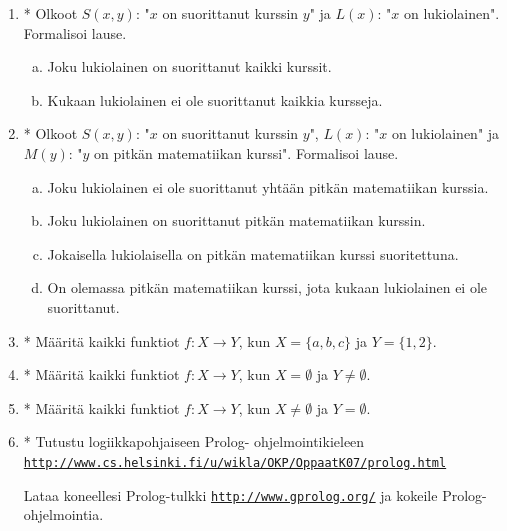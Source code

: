 \begin{enumerate}
\item * %
 Olkoot $S(x,y)$: "$x$ on suorittanut
kurssin $y$" ja $L(x)$: "$x$ on lukiolainen". Formalisoi lause.
\begin{enumerate}[a)]
\item Joku lukiolainen on suorittanut kaikki kurssit.
\item Kukaan lukiolainen ei ole suorittanut kaikkia kursseja.
\end{enumerate}

\item * %
Olkoot $S(x,y)$: "$x$ on suorittanut
kurssin $y$", $L(x)$: "$x$ on lukiolainen" ja $M(y)$: "$y$ on
pitkän matematiikan kurssi". Formalisoi lause.
\begin{enumerate}[a)]
\item Joku lukiolainen ei ole suorittanut yhtään pitkän
matematiikan kurssia.
\item Joku lukiolainen on suorittanut pitkän matematiikan
kurssin.
\item Jokaisella lukiolaisella on pitkän matematiikan kurssi
suoritettuna.
\item On olemassa pitkän matematiikan kurssi, jota kukaan
lukiolainen ei ole suorittanut.
\end{enumerate}

\item * %
Määritä kaikki funktiot $f\colon X\to Y$,
kun $X=\{a,b,c\}$ ja $Y=\{1,2\}$.

\item * %
Määritä kaikki funktiot $f\colon X\to Y$,
kun $X=\emptyset$ ja $Y\neq \emptyset$.

\item * %
Määritä kaikki funktiot $f\colon X\to Y$,
kun $X\neq \emptyset$ ja $Y= \emptyset$.

\item * %
Tutustu logiikkapohjaiseen Prolog-
ohjelmointikieleen\\
\href{http://www.cs.helsinki.fi/u/wikla/OKP/OppaatK07/prolog.html}
{{\tt http://www.cs.helsinki.fi/u/wikla/OKP/OppaatK07/prolog.html}}

Lataa koneellesi Prolog-tulkki \href{http://www.gprolog.org/}
{{\tt http://www.gprolog.org/}}
ja kokeile Prolog-ohjelmointia.

\end{enumerate}
